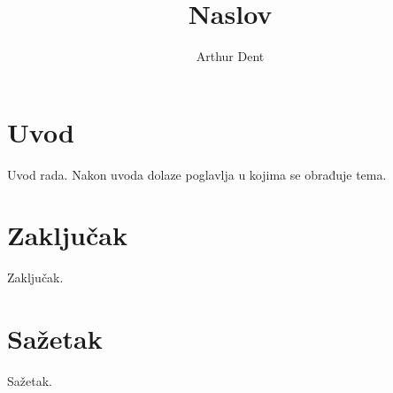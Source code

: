 \documentclass[times, utf8, seminar]{fer}
\begin{document}
\title{Naslov}

\author{Arthur Dent}


\maketitle

\tableofcontents

\chapter{Uvod}
Uvod rada. Nakon uvoda dolaze poglavlja u kojima se obrađuje tema.

\chapter{Zaključak}
Zaključak.




\chapter{Sažetak}
Sažetak.
\end{document}
